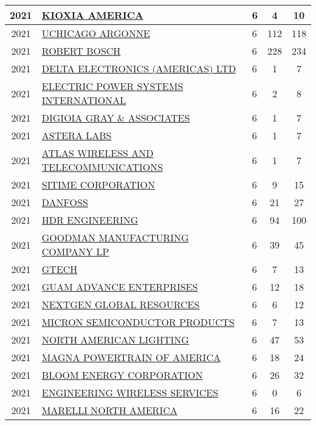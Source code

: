 \documentclass{article}%
\begin{document}
\begin{longtable}{c|p{20em}|p{5em}|c|c}
\hline%
2021&\hyperref[subsec:KIOXIAAMERICA]{KIOXIA AMERICA}&6&4&10\\%
\hline%
2021&\hyperref[subsec:UCHICAGOARGONNE]{UCHICAGO ARGONNE}&6&112&118\\%
\hline%
2021&\hyperref[subsec:ROBERTBOSCH]{ROBERT BOSCH}&6&228&234\\%
\hline%
2021&\hyperref[subsec:DELTAELECTRONICS(AMERICAS)LTD]{DELTA ELECTRONICS (AMERICAS) LTD}&6&1&7\\%
\hline%
2021&\hyperref[subsec:ELECTRICPOWERSYSTEMSINTERNATIONAL]{ELECTRIC POWER SYSTEMS INTERNATIONAL}&6&2&8\\%
\hline%
2021&\hyperref[subsec:DIGIOIAGRAYASSOCIATES]{DIGIOIA GRAY \& ASSOCIATES}&6&1&7\\%
\hline%
2021&\hyperref[subsec:ASTERALABS]{ASTERA LABS}&6&1&7\\%
\hline%
2021&\hyperref[subsec:ATLASWIRELESSANDTELECOMMUNICATIONS]{ATLAS WIRELESS AND TELECOMMUNICATIONS}&6&1&7\\%
\hline%
2021&\hyperref[subsec:SITIMECORPORATION]{SITIME CORPORATION}&6&9&15\\%
\hline%
2021&\hyperref[subsec:DANFOSS]{DANFOSS}&6&21&27\\%
\hline%
2021&\hyperref[subsec:HDRENGINEERING]{HDR ENGINEERING}&6&94&100\\%
\hline%
2021&\hyperref[subsec:GOODMANMANUFACTURINGCOMPANYLP]{GOODMAN MANUFACTURING COMPANY LP}&6&39&45\\%
\hline%
2021&\hyperref[subsec:GTECH]{GTECH}&6&7&13\\%
\hline%
2021&\hyperref[subsec:GUAMADVANCEENTERPRISES]{GUAM ADVANCE ENTERPRISES}&6&12&18\\%
\hline%
2021&\hyperref[subsec:NEXTGENGLOBALRESOURCES]{NEXTGEN GLOBAL RESOURCES}&6&6&12\\%
\hline%
2021&\hyperref[subsec:MICRONSEMICONDUCTORPRODUCTS]{MICRON SEMICONDUCTOR PRODUCTS}&6&7&13\\%
\hline%
2021&\hyperref[subsec:NORTHAMERICANLIGHTING]{NORTH AMERICAN LIGHTING}&6&47&53\\%
\hline%
2021&\hyperref[subsec:MAGNAPOWERTRAINOFAMERICA]{MAGNA POWERTRAIN OF AMERICA}&6&18&24\\%
\hline%
2021&\hyperref[subsec:BLOOMENERGYCORPORATION]{BLOOM ENERGY CORPORATION}&6&26&32\\%
\hline%
2021&\hyperref[subsec:ENGINEERINGWIRELESSSERVICES]{ENGINEERING WIRELESS SERVICES}&6&0&6\\%
\hline%
2021&\hyperref[subsec:MARELLINORTHAMERICA]{MARELLI NORTH AMERICA}&6&16&22\\%

\end{longtable}
\end{document}
